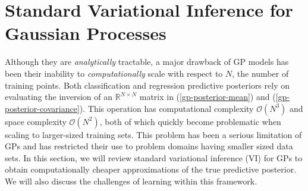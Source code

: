 \documentclass{article}
\numberwithin{equation}{section}
\begin{document}
\section{Standard Variational Inference for Gaussian Processes}\label{section:vi-gp}
Although they are \textit{analytically} tractable, a major drawback of GP models has been their inability to \textit{computationally} scale with respect to $N$, the number of training points.
Both classification and regression predictive posteriors rely on evaluating the inversion of an $\mathbb{R}^{N \times N}$ matrix in (\ref{gp-posterior-mean}) and (\ref{gp-posterior-covariance}).
This operation has computational complexity $\mathcal{O}(N^3)$ and space complexity $\mathcal{O}(N^2)$, both of which quickly become problematic when scaling to larger-sized training sets.
This problem has been a serious limitation of GPs and has restricted their use to problem domains having smaller sized data sets.
In this section, we will review standard variational inference (VI) for GPs to obtain computationally cheaper approximations of the true predictive posterior.
We will also discuss the challenges of learning within this framework.
\end{document}
